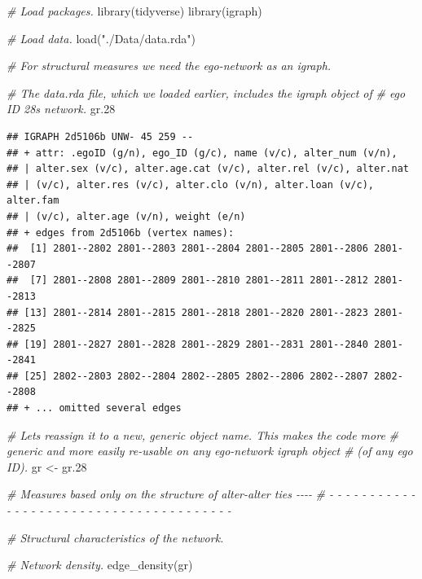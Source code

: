 \documentclass[
]{book}
\newenvironment{Shaded}{\begin{snugshade}}{\end{snugshade}}
\newcommand{\CommentTok}[1]{\textcolor[rgb]{0.56,0.35,0.01}{\textit{#1}}}
\newcommand{\FloatTok}[1]{\textcolor[rgb]{0.00,0.00,0.81}{#1}}
\newcommand{\FunctionTok}[1]{\textcolor[rgb]{0.00,0.00,0.00}{#1}}
\newcommand{\NormalTok}[1]{#1}
\newcommand{\OtherTok}[1]{\textcolor[rgb]{0.56,0.35,0.01}{#1}}
\newcommand{\StringTok}[1]{\textcolor[rgb]{0.31,0.60,0.02}{#1}}
\begin{document}
\begin{Shaded}
\begin{Highlighting}[]
\CommentTok{\# Load packages.}
\FunctionTok{library}\NormalTok{(tidyverse)}
\FunctionTok{library}\NormalTok{(igraph)}

\CommentTok{\# Load data.}
\FunctionTok{load}\NormalTok{(}\StringTok{"./Data/data.rda"}\NormalTok{)}

\CommentTok{\# For structural measures we need the ego{-}network as an igraph.}

\CommentTok{\# The data.rda file, which we loaded earlier, includes the igraph object of}
\CommentTok{\# ego ID 28\textquotesingle{}s network.}
\NormalTok{gr}\FloatTok{.28}
\end{Highlighting}
\end{Shaded}

\begin{verbatim}
## IGRAPH 2d5106b UNW- 45 259 -- 
## + attr: .egoID (g/n), ego_ID (g/c), name (v/c), alter_num (v/n),
## | alter.sex (v/c), alter.age.cat (v/c), alter.rel (v/c), alter.nat
## | (v/c), alter.res (v/c), alter.clo (v/n), alter.loan (v/c), alter.fam
## | (v/c), alter.age (v/n), weight (e/n)
## + edges from 2d5106b (vertex names):
##  [1] 2801--2802 2801--2803 2801--2804 2801--2805 2801--2806 2801--2807
##  [7] 2801--2808 2801--2809 2801--2810 2801--2811 2801--2812 2801--2813
## [13] 2801--2814 2801--2815 2801--2818 2801--2820 2801--2823 2801--2825
## [19] 2801--2827 2801--2828 2801--2829 2801--2831 2801--2840 2801--2841
## [25] 2802--2803 2802--2804 2802--2805 2802--2806 2802--2807 2802--2808
## + ... omitted several edges
\end{verbatim}

\begin{Shaded}
\begin{Highlighting}[]
\CommentTok{\# Let\textquotesingle{}s reassign it to a new, generic object name. This makes the code more }
\CommentTok{\# generic and more easily re{-}usable on any ego{-}network igraph object }
\CommentTok{\# (of any ego ID).}
\NormalTok{gr }\OtherTok{\textless{}{-}}\NormalTok{ gr}\FloatTok{.28}

\CommentTok{\# Measures based only on the structure of alter{-}alter ties                  {-}{-}{-}{-}}
\CommentTok{\# {-} {-} {-} {-} {-} {-} {-} {-} {-} {-} {-} {-} {-} {-} {-} {-} {-} {-} {-} {-} {-} {-} {-} {-} {-} {-} {-} {-} {-} {-} {-} {-} {-} {-} {-} {-} {-} {-} {-} }

\CommentTok{\# Structural characteristics of the network.}

\CommentTok{\# Network density.}
\FunctionTok{edge\_density}\NormalTok{(gr)}
\end{Highlighting}
\end{Shaded}
\end{document}

